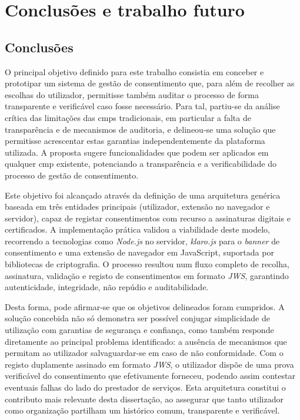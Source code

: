 \chapter{Conclusões e trabalho futuro}
\label{cap:conclusoes}

\section{Conclusões}

O principal objetivo definido para este trabalho consistia em conceber e prototipar um sistema de gestão de consentimento que, para além de recolher as escolhas do utilizador, permitisse também auditar o processo de forma transparente e verificável caso fosse necessário. Para tal, partiu-se da análise crítica das limitações das \acrshort{cmp}s tradicionais, em particular a falta de transparência e de mecanismos de auditoria, e delineou-se uma solução que permitisse acrescentar estas garantias independentemente da plataforma utilizada. A proposta sugere funcionalidades que podem ser aplicados em qualquer \acrshort{cmp} existente, potenciando a transparência e a verificabilidade do processo de gestão de consentimento.

Este objetivo foi alcançado através da definição de uma arquitetura genérica baseada em três entidades principais (utilizador, extensão no navegador e servidor), capaz de registar consentimentos com recurso a assinaturas digitais e certificados. A implementação prática validou a viabilidade deste modelo, recorrendo a tecnologias como \textit{Node.js} no servidor, \textit{klaro.js} para o \textit{banner} de consentimento e uma extensão de navegador em JavaScript, suportada por bibliotecas de criptografia. O processo resultou num fluxo completo de recolha, assinatura, validação e registo de consentimentos em formato \textit{JWS}, garantindo autenticidade, integridade, não repúdio e auditabilidade.

Desta forma, pode afirmar-se que os objetivos delineados foram cumpridos. A solução concebida não só demonstra ser possível conjugar simplicidade de utilização com garantias de segurança e confiança, como também responde diretamente ao principal problema identificado: a ausência de mecanismos que permitam ao utilizador salvaguardar-se em caso de não conformidade. Com o registo duplamente assinado em formato \textit{JWS}, o utilizador dispõe de uma prova verificável do consentimento que efetivamente forneceu, podendo assim contestar eventuais falhas do lado do prestador de serviços. Esta arquitetura constitui o contributo mais relevante desta dissertação, ao assegurar que tanto utilizador como organização partilham um histórico comum, transparente e verificável.

